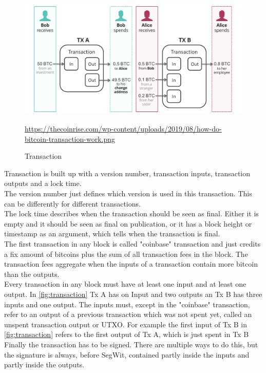 \begin{figure}[!ht]
    \centering
    \includegraphics[width=\textwidth]{Ausarbeitung/images/transaction.png} \caption[Transaction]{Transaction}
    \small \url{https://thecoinrise.com/wp-content/uploads/2019/08/how-do-bitcoin-transaction-work.png}
    \label{fig:transaction}
\end{figure}
Transaction is built up with a version number, transaction inputs, transaction outputs and a lock time. \\
The version number just defines which version is used in this transaction. This can be differently for different transactions. \\
The lock time describes when the transaction should be seen as final. Either it is empty and it should be seen as final on publication, or it has a block height or timestamp as an argument, which tells when the transaction is final. \\
The first transaction in any block is called "coinbase" transaction and just credits a fix amount of bitcoins plus the sum of all transaction fees in the block. The transaction fees aggregate when the inputs of a transaction contain more bitcoin than the outputs. \\
Every transaction in any block must have at least one input and at least one output. In \autoref{fig:transaction} Tx A has on Input and two outputs an Tx B has three inputs and one output. The inputs must, except in the "coinbase" transaction, refer to an output of a previous transaction which was not spent yet, called an unspent transaction output or UTXO. For example the first input of Tx B in \autoref{fig:transaction} refers to the first output of Tx A, which is just spent in Tx B \\
Finally the transaction has to be signed. There are multiple ways to do this, but the signature is always, before SegWit, contained partly inside the inputs and partly inside the outputs.

